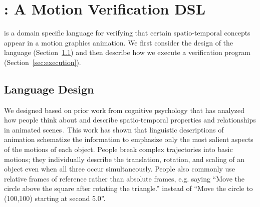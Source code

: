 \section{\dslname{}: A Motion Verification DSL}
\label{sec:moverDSL}

\dslname{} is a domain specific language for verifying that certain
spatio-temporal concepts appear in a motion graphics animation.
%
We first consider the design of the \dslname{} language (Section~\ref{sec:design}) and then describe
how we execute a \dslname{} verification program (Section~\ref{sec:execution}).

\subsection{\dslname{} Language Design}
\label{sec:design}

We designed \dslname{} based on prior work from cognitive psychology
that has analyzed how people think about and describe spatio-temporal properties and relationships in animated
scenes\,\cite{talmy1983language,talmy1975motion,tversky1998space}.
%
%
%
%
This work has shown that linguistic descriptions of animation
schematize the information to emphasize only the most salient aspects
of the motions of each object.
%
People break complex trajectories into basic motions; they
individually describe the translation, rotation, and scaling of an
object even when all three occur simultaneously. 
%
People also commonly use relative frames of reference rather than absolute frames,
e.g. saying ``Move the circle above the square after rotating the
triangle.'' instead of ``Move the circle to (100,100) starting at second 5.0''.
%


